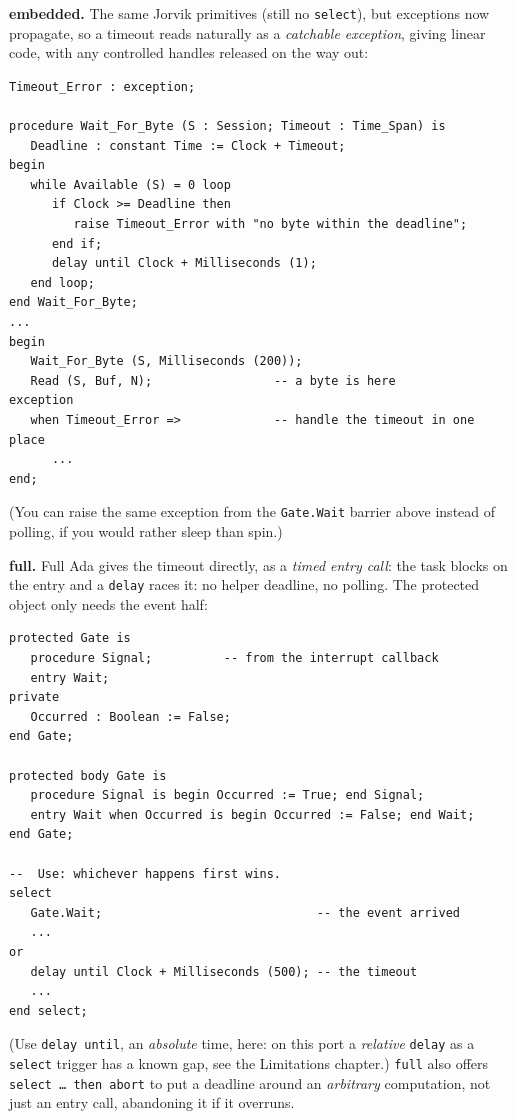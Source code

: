 \textbf{embedded.} The same Jorvik primitives (still no \texttt{select}), but
exceptions now propagate, so a timeout reads naturally as a \emph{catchable
exception}, giving linear code, with any controlled handles released on the way
out:

\begin{lstlisting}
Timeout_Error : exception;

procedure Wait_For_Byte (S : Session; Timeout : Time_Span) is
   Deadline : constant Time := Clock + Timeout;
begin
   while Available (S) = 0 loop
      if Clock >= Deadline then
         raise Timeout_Error with "no byte within the deadline";
      end if;
      delay until Clock + Milliseconds (1);
   end loop;
end Wait_For_Byte;
...
begin
   Wait_For_Byte (S, Milliseconds (200));
   Read (S, Buf, N);                 -- a byte is here
exception
   when Timeout_Error =>             -- handle the timeout in one place
      ...
end;
\end{lstlisting}

(You can raise the same exception from the \texttt{Gate.Wait} barrier above
instead of polling, if you would rather sleep than spin.)

\textbf{full.} Full Ada gives the timeout directly, as a \emph{timed entry call}:
the task blocks on the entry and a \texttt{delay} races it: no helper deadline,
no polling. The protected object only needs the event half:

\begin{lstlisting}
protected Gate is
   procedure Signal;          -- from the interrupt callback
   entry Wait;
private
   Occurred : Boolean := False;
end Gate;

protected body Gate is
   procedure Signal is begin Occurred := True; end Signal;
   entry Wait when Occurred is begin Occurred := False; end Wait;
end Gate;

--  Use: whichever happens first wins.
select
   Gate.Wait;                              -- the event arrived
   ...
or
   delay until Clock + Milliseconds (500); -- the timeout
   ...
end select;
\end{lstlisting}

(Use \texttt{delay until}, an \emph{absolute} time, here: on this port a
\emph{relative} \texttt{delay} as a \texttt{select} trigger has a known gap, see
the Limitations chapter.) \texttt{full} also offers \texttt{select \dots\ then
abort} to put a deadline around an \emph{arbitrary} computation, not just an entry
call, abandoning it if it overruns.


